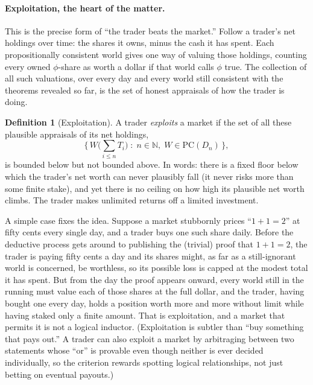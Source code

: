 \documentclass[10pt]{article}
\theoremstyle{definition}
\newtheorem{definition}[theorem]{Definition}
\theoremstyle{remark}
\newcommand{\N}{\mathbb{N}}
\newcommand{\PC}{\mathrm{PC}}
\begin{document}
\paragraph{Exploitation, the heart of the matter.} This is the precise form of ``the trader beats the market.'' Follow a trader's net holdings over time: the shares it owns, minus the cash it has spent. Each propositionally consistent world gives one way of valuing those holdings, counting every owned $\phi$-share as worth a dollar if that world calls $\phi$ true. The collection of all such valuations, over every day and every world still consistent with the theorems revealed so far, is the set of honest appraisals of how the trader is doing.

\begin{definition}[Exploitation]
\label{def:exploit}
A trader \emph{exploits} a market if the set of all these plausible appraisals of its net holdings,
\[
\Big\{\, W\Big(\textstyle\sum_{i \le n} T_i\Big) \;:\; n \in \N,\; W \in \PC(D_n) \,\Big\},
\]
is bounded below but not bounded above. In words: there is a fixed floor below which the trader's net worth can never plausibly fall (it never risks more than some finite stake), and yet there is no ceiling on how high its plausible net worth climbs. The trader makes unlimited returns off a limited investment.
\end{definition}

A simple case fixes the idea. Suppose a market stubbornly prices ``$1+1=2$'' at fifty cents every single day, and a trader buys one such share daily. Before the deductive process gets around to publishing the (trivial) proof that $1+1=2$, the trader is paying fifty cents a day and its shares might, as far as a still-ignorant world is concerned, be worthless, so its possible loss is capped at the modest total it has spent. But from the day the proof appears onward, every world still in the running must value each of those shares at the full dollar, and the trader, having bought one every day, holds a position worth more and more without limit while having staked only a finite amount. That is exploitation, and a market that permits it is not a logical inductor. (Exploitation is subtler than ``buy something that pays out.'' A trader can also exploit a market by arbitraging between two statements whose ``or'' is provable even though neither is ever decided individually, so the criterion rewards spotting logical relationships, not just betting on eventual payouts.)
\end{document}
